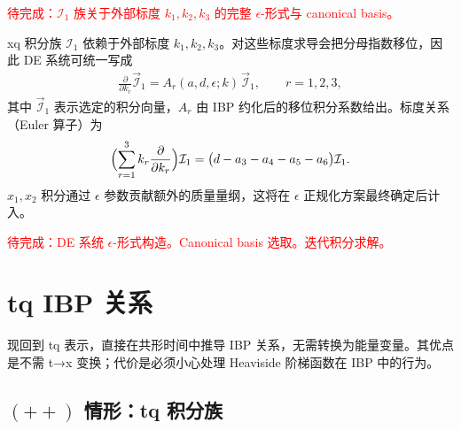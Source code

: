 ﻿\documentclass[a4paper,11pt]{article}
\begin{document}
\textcolor{red}{待完成：$\mathcal{I}_1$ 族关于外部标度 $k_1,k_2,k_3$ 的完整 $\epsilon$-形式与 canonical basis。}

xq 积分族 $\mathcal{I}_1$ 依赖于外部标度 $k_1,k_2,k_3$。对这些标度求导会把分母指数移位，因此 DE 系统可统一写成
\begin{align}
    \frac{\partial}{\partial k_r}\vec{\mathcal{I}}_1
    =A_r(a,d,\epsilon;k)\,\vec{\mathcal{I}}_1,\qquad r=1,2,3,
\end{align}
其中 $\vec{\mathcal{I}}_1$ 表示选定的积分向量，$A_r$ 由 IBP 约化后的移位积分系数给出。标度关系（Euler 算子）为
\begin{equation}
    \Bigl(\sum_{r=1}^{3} k_r\frac{\partial}{\partial k_r}\Bigr)\mathcal{I}_1
    =\bigl(d-a_3-a_4-a_5-a_6\bigr)\mathcal{I}_1.
\end{equation}
$x_1,x_2$ 积分通过 $\epsilon$ 参数贡献额外的质量量纲，这将在 $\epsilon$ 正规化方案最终确定后计入。

\textcolor{red}{待完成：DE 系统 $\epsilon$-形式构造。Canonical basis 选取。迭代积分求解。}

\newpage
\section{tq IBP 关系}

现回到 tq 表示，直接在共形时间中推导 IBP 关系，无需转换为能量变量。其优点是不需 t→x 变换；代价是必须小心处理 Heaviside 阶梯函数在 IBP 中的行为。

\subsection{$(++)$ 情形：tq 积分族}
\end{document}

